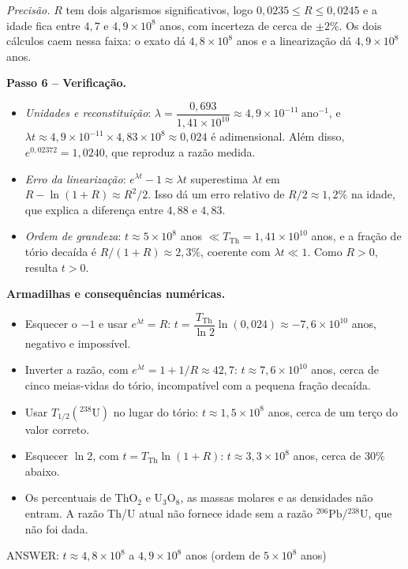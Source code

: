 \documentclass{article}%
\begin{document}
\emph{Precisão.} $R$ tem dois algarismos significativos, logo $0{,}0235\le R\le0{,}0245$ e a idade fica entre $4{,}7$ e $4{,}9\times10^{8}$ anos, com incerteza de cerca de $\pm2\%$. Os dois cálculos caem nessa faixa: o exato dá $4{,}8\times10^{8}$ anos e a linearização dá $4{,}9\times10^{8}$ anos.

\textbf{Passo 6 -- Verificação.}
\begin{itemize}
\item \textit{Unidades e reconstituição}: $\lambda=\dfrac{0{,}693}{1{,}41\times10^{10}}\approx4{,}9\times10^{-11}\ \text{ano}^{-1}$, e $\lambda t\approx4{,}9\times10^{-11}\times4{,}83\times10^{8}\approx0{,}024$ é adimensional. Além disso, $e^{0{,}02372}=1{,}0240$, que reproduz a razão medida.
\item \textit{Erro da linearização}: $e^{\lambda t}-1\approx\lambda t$ superestima $\lambda t$ em $R-\ln(1+R)\approx R^2/2$. Isso dá um erro relativo de $R/2\approx1{,}2\%$ na idade, que explica a diferença entre $4{,}88$ e $4{,}83$.
\item \textit{Ordem de grandeza}: $t\approx5\times10^{8}$ anos $\ll T_{\mathrm{Th}}=1{,}41\times10^{10}$ anos, e a fração de tório decaída é $R/(1+R)\approx2{,}3\%$, coerente com $\lambda t\ll1$. Como $R>0$, resulta $t>0$.
\end{itemize}

\textbf{Armadilhas e consequências numéricas.}
\begin{itemize}
\item Esquecer o $-1$ e usar $e^{\lambda t}=R$: $t=\dfrac{T_{\mathrm{Th}}}{\ln2}\ln(0{,}024)\approx-7{,}6\times10^{10}$ anos, negativo e impossível.
\item Inverter a razão, com $e^{\lambda t}=1+1/R\approx42{,}7$: $t\approx7{,}6\times10^{10}$ anos, cerca de cinco meias-vidas do tório, incompatível com a pequena fração decaída.
\item Usar $T_{1/2}({}^{238}\mathrm{U})$ no lugar do tório: $t\approx1{,}5\times10^{8}$ anos, cerca de um terço do valor correto.
\item Esquecer $\ln 2$, com $t=T_{\mathrm{Th}}\ln(1+R)$: $t\approx3{,}3\times10^{8}$ anos, cerca de $30\%$ abaixo.
\item Os percentuais de $\mathrm{ThO}_2$ e $\mathrm{U}_3\mathrm{O}_8$, as massas molares e as densidades não entram. A razão Th/U atual não fornece idade sem a razão ${}^{206}\mathrm{Pb}/{}^{238}\mathrm{U}$, que não foi dada.
\end{itemize}

\noindent ANSWER: $t\approx4{,}8\times10^{8}$ a $4{,}9\times10^{8}$ anos (ordem de $5\times10^{8}$ anos)%
\newpage%
\end{document}
